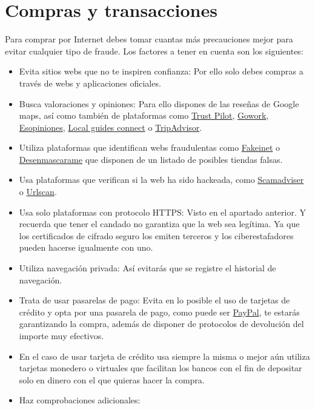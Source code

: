 \documentclass[
  a4paper,
  openany]{book}
\begin{document}
\hypertarget{compras-y-transacciones}{%
\section{Compras y transacciones}\label{compras-y-transacciones}}

Para comprar por Internet debes tomar cuantas más precauciones mejor para evitar cualquier tipo de fraude. Los factores a tener en cuenta son los siguientes:

\begin{itemize}
\item
  Evita sitios webs que no te inspiren confianza: Por ello solo debes compras a través de webs y aplicaciones oficiales.
\item
  Busca valoraciones y opiniones: Para ello dispones de las reseñas de Google maps, así como también de plataformas como \href{https://es.trustpilot.com/}{Trust Pilot}, \href{https://es.gowork.com/}{Gowork}, \href{https://esopiniones.com/}{Esopiniones}, \href{https://www.localguidesconnect.com/}{Local guides connect} o \href{https://www.tripadvisor.es/}{TripAdvisor}.
\item
  Utiliza plataformas que identifican webs fraudulentas como \href{https://fakeinet.com/}{Fakeinet} o \href{https://desenmascara.me/}{Desenmascarame} que disponen de un listado de posibles tiendas falsas.
\item
  Usa plataformas que verifican si la web ha sido hackeada, como \href{https://www.scamadviser.com/}{Scamadviser} o \href{https://urlscan.io/}{Urlscan}.
\item
  Usa solo plataformas con protocolo HTTPS: Visto en el apartado anterior. Y recuerda que tener el candado no garantiza que la web sea legítima. Ya que los certificados de cifrado seguro los emiten terceros y los ciberestafadores pueden hacerse igualmente con uno.
\item
  Utiliza navegación privada: Así evitarás que se registre el historial de navegación.
\item
  Trata de usar pasarelas de pago: Evita en lo posible el uso de tarjetas de crédito y opta por una pasarela de pago, como puede ser \href{https://www.paypal.com/es/home}{PayPal}, te estarás garantizando la compra, además de disponer de protocolos de devolución del importe muy efectivos.
\item
  En el caso de usar tarjeta de crédito usa siempre la misma o mejor aún utiliza tarjetas monedero o virtuales que facilitan los bancos con el fin de depositar solo en dinero con el que quieras hacer la compra.
\item
  Haz comprobaciones adicionales:


\end{itemize}
\end{document}
